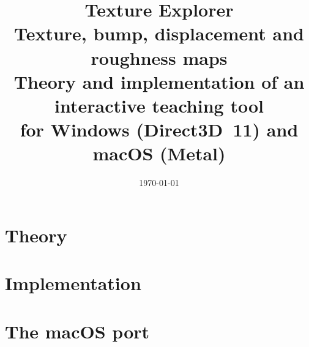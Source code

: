 \documentclass[11pt,a4paper,openany]{report}
\title{\Huge\textbf{Texture Explorer}\\[10pt]
  \LARGE Texture, bump, displacement and roughness maps\\[4pt]
  \large Theory and implementation of an interactive teaching tool\\[4pt]
  \normalsize for Windows (Direct3D~11) and macOS (Metal)}
\author{}
\date{\today}
\begin{document}
\maketitle
\thispagestyle{empty}
\tableofcontents
\clearpage
{}


\part{Theory}





\part{Implementation}







\part{The macOS port}


\appendix


\end{document}

